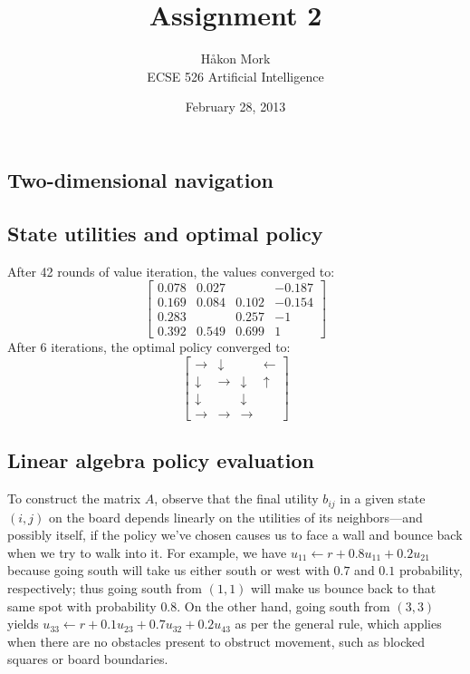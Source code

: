 \documentclass[letterpaper, 10pt]{article}
\title{\textbf{Assignment 2}}
\author{Håkon Mork \\ ECSE 526 Artificial Intelligence}
\date{February 28, 2013}
\begin{document}
\maketitle
\noindent
\begin{multicols*}{2}

\section{Two-dimensional navigation}
\subsection{State utilities and optimal policy}
After 42 rounds of value iteration, the values converged to:
\[
	\begin{bmatrix}
		0.078 & 0.027 &       & -0.187 \\
		0.169 & 0.084 & 0.102 & -0.154 \\
		0.283 &       & 0.257 & -1 \\
		0.392 & 0.549 & 0.699 & 1
	\end{bmatrix}
\]
After 6 iterations, the optimal policy converged to:
\[
	\begin{bmatrix}
		\rightarrow & \downarrow &       & \leftarrow \\
		\downarrow & \rightarrow & \downarrow & \uparrow \\
		\downarrow &       & \downarrow &  \\
		\rightarrow & \rightarrow & \rightarrow & 
	\end{bmatrix}
\]

\subsection{Linear algebra policy evaluation}
To construct the matrix $A$, observe that the final utility $b_{ij}$ in a given state $(i, j)$ on the board depends linearly on the utilities of its neighbors---and possibly itself, if the policy we've chosen causes us to face a wall and bounce back when we try to walk into it. 
For example, we have $u_{11} \gets r + 0.8 u_{11} + 0.2 u_{21}$ because going south will take us either south or west with $0.7$ and $0.1$ probability, respectively; thus going south from $(1,1)$ will make us bounce back to that same spot with probability $0.8$. 
On the other hand, going south from $(3,3)$ yields $u_{33} \gets r + 0.1 u_{23} + 0.7 u_{32} + 0.2 u_{43}$ as per the general rule, which applies when there are no obstacles present to obstruct movement, such as blocked squares or board boundaries. 


\end{multicols*}
\end{document}
